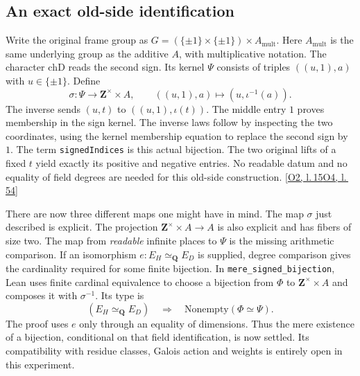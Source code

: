 \documentclass[12pt,letterpaper]{article}
\newcommand{\id}[1]{{\small\nolinkurl{#1}}}
\begin{document}
\subsection{An exact old-side identification}
Write the original frame group as $G=(\{\pm1\}\times\{\pm1\})\times A_{\mathrm{mult}}$. Here $A_{\mathrm{mult}}$ is the same underlying group as the additive $A$, with multiplicative notation. The character $\mathrm{chD}$ reads the second sign. Its kernel $\Psi$ consists of triples $((u,1),a)$ with $u\in\{\pm1\}$. Define
\[
  \sigma:\Psi\longrightarrow\mathbf Z^\times\times A,\qquad
  ((u,1),a)\longmapsto(u,\iota^{-1}(a)).
\]
The inverse sends $(u,t)$ to $((u,1),\iota(t))$. The middle entry $1$ proves membership in the sign kernel. The inverse laws follow by inspecting the two coordinates, using the kernel membership equation to replace the second sign by $1$. The term \id{signedIndices} is this actual bijection. The two original lifts of a fixed $t$ yield exactly its positive and negative entries. No readable datum and no equality of field degrees are needed for this old-side construction.  {\footnotesize\sffamily\color{mute}[\href{https://github.com/nousentllc/riemann-hypothesis/blob/40e56bab026552e089d7afcfeff08d2defb9c005/src/Formalism/SharpRestriction/RamificationFrobenius/TotientGaloisClasses/ZsmulGeneratorEqZeroOfProjection.lean\#L15}{O2, l.\,15}\enspace \href{https://github.com/nousentllc/riemann-hypothesis/blob/40e56bab026552e089d7afcfeff08d2defb9c005/src/Formalism/SharpRestriction/RamificationFrobenius/TotientGaloisClasses/FrameFacts.lean\#L54}{O4, l.\,54}]}

There are now three different maps one might have in mind. The map $\sigma$ just described is explicit. The projection $\mathbf Z^\times\times A\to A$ is also explicit and has fibers of size two. The map from \emph{readable} infinite places to $\Psi$ is the missing arithmetic comparison. If an isomorphism $e:E_H\simeq_{\mathbf Q} E_D$ is supplied, degree comparison gives the cardinality required for some finite bijection. In \id{mere_signed_bijection}, Lean uses finite cardinal equivalence to choose a bijection from $\Phi$ to $\mathbf Z^\times\times A$ and composes it with $\sigma^{-1}$. Its type is
\[
       (E_H\simeq_{\mathbf Q} E_D)\quad\Longrightarrow\quad
                        \mathrm{Nonempty}(\Phi\simeq\Psi).
\]
The proof uses $e$ only through an equality of dimensions. Thus the mere existence of a bijection, conditional on that field identification, is now settled. Its compatibility with residue classes, Galois action and weights is entirely open in this experiment.
\end{document}

